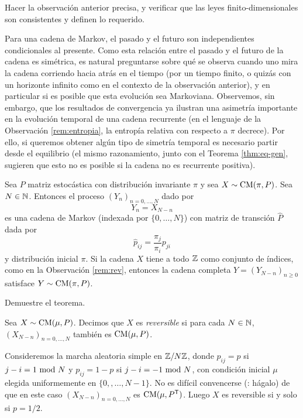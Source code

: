 \begin{exer}
Hacer la observación anterior precisa, y verificar que las leyes finito-dimensionales son consistentes y definen lo requerido.
\end{exer}

Para una cadena de Markov, el pasado y el futuro son independientes condicionales al presente.
Como esta relación entre el pasado y el futuro de la cadena es simétrica, es natural preguntarse sobre qué se observa cuando uno mira la cadena corriendo hacia atrás en el tiempo (por un tiempo finito, o quizás con un horizonte infinito como en el contexto de la observación anterior), y en particular si es posible que esta evolución sea Markoviana.
Observemos, sin embargo, que los resultados de convergencia ya ilustran una asimetría importante en la evolución temporal de una cadena recurrente (en el lenguaje de la Observación \ref{rem:entropia}, la entropía relativa con respecto a $\pi$ decrece).
Por ello, si queremos obtener algún tipo de simetría temporal es necesario partir desde el equilibrio (el mismo razonamiento, junto con el Teorema \ref{thm:eq-gen}, sugieren que esto no es posible si la cadena no es recurrente positiva).

\begin{thm}\label{thm:rev}
Sea $P$ matriz estocástica con distribución invariante $\pi$ y sea $X\sim\text{\upshape{CM}}(\pi,P)$.
Sea $N\in\mathbb{N}$.
Entonces el proceso $(Y_n)_{n=0,\dotsc,N}$ dado por
\[Y_n=X_{N-n}\]
es una cadena de Markov (indexada por $\{0,\dotsc,N\}$) con matriz de transción $\hat P$ dada por
\[\hat p_{ij}=\frac{\pi_j}{\pi_i}p_{ji}\]
y distribución inicial $\pi$.
Si la cadena $X$ tiene a todo $\mathbb{Z}$ como conjunto de índices, como en la Observación \ref{rem:rev}, entonces la cadena completa $Y=(Y_{N-n})_{n\geq0}$ satisface $Y\sim\text{\upshape{CM}}(\pi,P)$.
\end{thm}

\begin{exer}
Demuestre el teorema.
\end{exer}

\begin{defn}
Sea $X\sim\text{\upshape{CM}}(\mu,P)$.
Decimos que $X$ es \emph{reversible} si para cada $N\in\mathbb{N}$, $(X_{N-n})_{n=0,\dotsc,N}$ también es $\text{\upshape{CM}}(\mu,P)$.
\end{defn}

\begin{ex}
Consideremos la marcha aleatoria simple en $\mathbb{Z}/N\mathbb{Z}$, donde $p_{ij}=p$ si $j-i=1~\text{\upshape{mod}}~N$ y $p_{ij}=1-p$ si $j-i=-1~\text{\upshape{mod}}~N$, con condición inicial $\mu$ elegida uniformemente en $\{0,,\dotsc,N-1\}$.
No es difícil convencerse (\uexers: hágalo) de que en este caso $(X_{N-n})_{n=0,\dotsc,N}$ es $\text{\upshape{CM}}(\mu,P^{\sf T})$.
Luego $X$ es reversible si y solo si $p=1/2$.
\end{ex}

